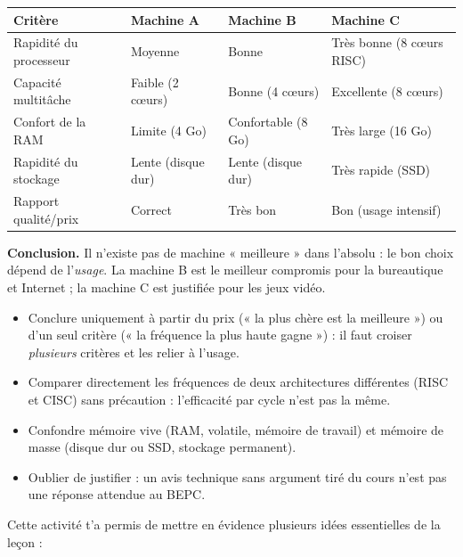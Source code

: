 \documentclass[11pt]{article}
\newcounter{popsec}
\newcounter{popsub}
\newcommand{\courssub}[1]{%
  \stepcounter{popsub}%
  \par\vspace{9pt}\noindent{\popxbold\fontsize{11.5}{13}\selectfont\color{popink}{\color{poporange}\thepopsec.\thepopsub}\hspace{6pt}#1}\par\nopagebreak\vspace{4pt}
}
\begin{document}
\begin{exoresolu}
\begin{center}
\begin{tabularx}{\linewidth}{|l|X|X|X|}
\hline
\rowcolor{popblueL} \textbf{Critère} & \textbf{Machine A} & \textbf{Machine B} & \textbf{Machine C} \\
\hline
Rapidité du processeur & Moyenne & Bonne & Très bonne (8 cœurs RISC) \\
\hline
Capacité multitâche & Faible (2 cœurs) & Bonne (4 cœurs) & Excellente (8 cœurs) \\
\hline
Confort de la RAM & Limite (4 Go) & Confortable (8 Go) & Très large (16 Go) \\
\hline
Rapidité du stockage & Lente (disque dur) & Lente (disque dur) & Très rapide (SSD) \\
\hline
Rapport qualité/prix & Correct & Très bon & Bon (usage intensif) \\
\hline
\end{tabularx}
\end{center}

\textbf{Conclusion.} Il n'existe pas de machine « meilleure » dans l'absolu : le bon choix dépend de l'\emph{usage}. La machine B est le meilleur compromis pour la bureautique et Internet ; la machine C est justifiée pour les jeux vidéo.
\end{exoresolu}

\begin{attention}
\begin{itemize}
\item Conclure uniquement à partir du prix (« la plus chère est la meilleure ») ou d'un seul critère (« la fréquence la plus haute gagne ») : il faut croiser \emph{plusieurs} critères et les relier à l'usage.
\item Comparer directement les fréquences de deux architectures différentes (RISC et CISC) sans précaution : l'efficacité par cycle n'est pas la même.
\item Confondre mémoire vive (RAM, volatile, mémoire de travail) et mémoire de masse (disque dur ou SSD, stockage permanent).
\item Oublier de justifier : un avis technique sans argument tiré du cours n'est pas une réponse attendue au BEPC.
\end{itemize}
\end{attention}

\courssub{Bilan de l'activité}

Cette activité t'a permis de mettre en évidence plusieurs idées essentielles de la leçon :
\end{document}

